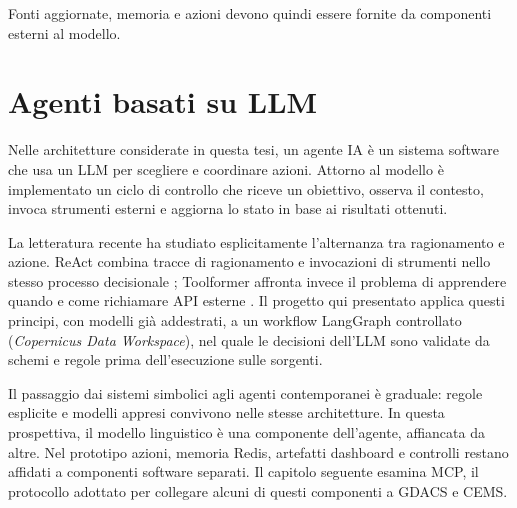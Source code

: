 Fonti aggiornate, memoria e azioni devono quindi essere fornite da componenti
esterni al modello.

\section{Agenti basati su LLM}

Nelle architetture considerate in questa tesi, un agente IA è un sistema
software che usa un LLM per scegliere e coordinare azioni. Attorno al modello è
implementato un ciclo di controllo che riceve un obiettivo, osserva il contesto,
invoca strumenti esterni e aggiorna lo stato in base ai risultati ottenuti.

La letteratura recente ha studiato esplicitamente l'alternanza tra ragionamento
e azione. ReAct combina tracce di ragionamento e invocazioni di strumenti nello
stesso processo decisionale \cite{yaoReAct}; Toolformer affronta invece il
problema di apprendere quando e come richiamare API esterne
\cite{schickToolformer}. Il progetto qui presentato applica questi
principi, con modelli già addestrati, a un workflow LangGraph controllato (\emph{Copernicus Data Workspace}),
nel quale le decisioni dell'LLM sono validate da schemi e regole prima
dell'esecuzione sulle sorgenti.

Il passaggio dai sistemi simbolici agli agenti contemporanei è graduale: regole esplicite e modelli appresi convivono nelle
stesse architetture. In questa prospettiva, il modello linguistico è una
componente dell'agente, affiancata da altre. Nel prototipo
azioni, memoria Redis, artefatti dashboard e controlli restano affidati a
componenti software separati. Il capitolo seguente esamina MCP, il protocollo
adottato per collegare alcuni di questi componenti a GDACS e CEMS.

